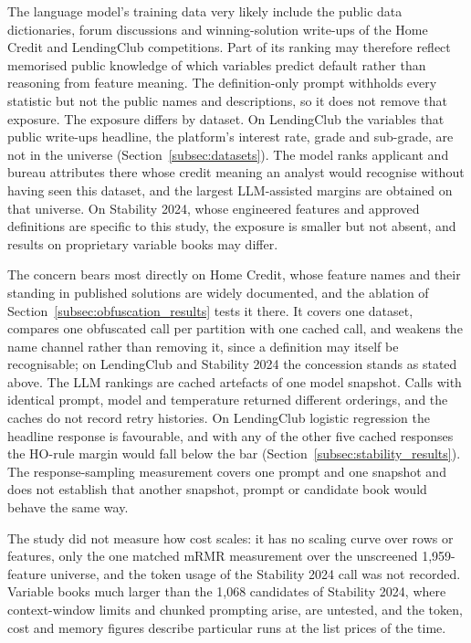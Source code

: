 \documentclass[final,5p,twocolumn]{elsarticle}
\begin{document}
The language model's training data very likely include the public data dictionaries, forum discussions and winning-solution write-ups of the Home Credit and LendingClub competitions. Part of its ranking may therefore reflect memorised public knowledge of which variables predict default rather than reasoning from feature meaning. The definition-only prompt withholds every statistic but not the public names and descriptions, so it does not remove that exposure. The exposure differs by dataset. On LendingClub the variables that public write-ups headline, the platform's interest rate, grade and sub-grade, are not in the universe (Section~\ref{subsec:datasets}). The model ranks applicant and bureau attributes there whose credit meaning an analyst would recognise without having seen this dataset, and the largest LLM-assisted margins are obtained on that universe. On Stability 2024, whose engineered features and approved definitions are specific to this study, the exposure is smaller but not absent, and results on proprietary variable books may differ.

The concern bears most directly on Home Credit, whose feature names and their standing in published solutions are widely documented, and the ablation of Section~\ref{subsec:obfuscation_results} tests it there. It covers one dataset, compares one obfuscated call per partition with one cached call, and weakens the name channel rather than removing it, since a definition may itself be recognisable; on LendingClub and Stability 2024 the concession stands as stated above. The LLM rankings are cached artefacts of one model snapshot. Calls with identical prompt, model and temperature returned different orderings, and the caches do not record retry histories. On LendingClub logistic regression the headline response is favourable, and with any of the other five cached responses the HO-rule margin would fall below the bar (Section~\ref{subsec:stability_results}). The response-sampling measurement covers one prompt and one snapshot and does not establish that another snapshot, prompt or candidate book would behave the same way.

The study did not measure how cost scales: it has no scaling curve over rows or features, only the one matched mRMR measurement over the unscreened 1,959-feature universe, and the token usage of the Stability 2024 call was not recorded. Variable books much larger than the 1,068 candidates of Stability 2024, where context-window limits and chunked prompting arise, are untested, and the token, cost and memory figures describe particular runs at the list prices of the time.
\end{document}
